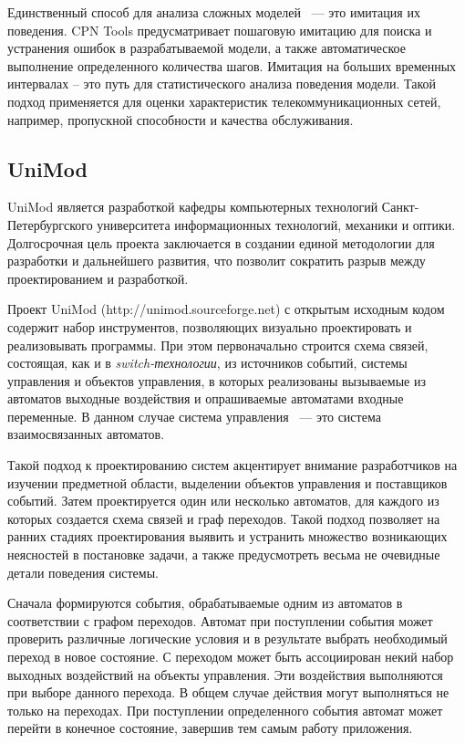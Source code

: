Единственный способ для анализа сложных моделей ~--- это имитация их поведения. CPN Tools предусматривает пошаговую имитацию для поиска и устранения ошибок в разрабатываемой модели, а также автоматическое выполнение определенного количества шагов. Имитация на больших временных интервалах – это путь для статистического анализа поведения модели. Такой подход применяется для оценки характеристик телекоммуникационных сетей, например, пропускной способности и качества обслуживания.

\subsection{UniMod}

UniMod является разработкой кафедры компьютерных технологий Санкт-Петербургского университета информационных технологий, механики и оптики. Долгосрочная цель проекта заключается в создании единой методологии для разработки и дальнейшего развития, что позволит сократить разрыв между проектированием и разработкой.

Проект UniMod (http://unimod.sourceforge.net) с открытым исходным кодом содержит набор инструментов, позволяющих визуально проектировать и реализовывать программы. При этом первоначально строится схема связей, состоящая, как и в \textit{switch-технологии}, из источников событий, системы управления и объектов управления, в которых реализованы вызываемые из автоматов выходные воздействия и опрашиваемые автоматами входные переменные. В данном случае система управления ~--- это система взаимосвязанных автоматов.

Такой подход к проектированию систем акцентирует внимание разработчиков на изучении предметной области, выделении объектов управления и поставщиков событий. Затем проектируется один или несколько автоматов, для каждого из которых создается схема связей и граф переходов. Такой подход позволяет на ранних стадиях проектирования выявить и устранить множество возникающих неясностей в постановке задачи, а также предусмотреть весьма не очевидные детали поведения системы.

Сначала формируются события, обрабатываемые одним из автоматов в соответствии с графом переходов. Автомат при поступлении события может проверить различные логические условия и в результате выбрать необходимый переход в новое состояние. С переходом может быть ассоциирован некий набор выходных воздействий на объекты управления. Эти воздействия выполняются при выборе данного перехода. В общем случае действия могут выполняться не только на переходах. При поступлении определенного события автомат может перейти в конечное состояние, завершив тем самым работу приложения.

